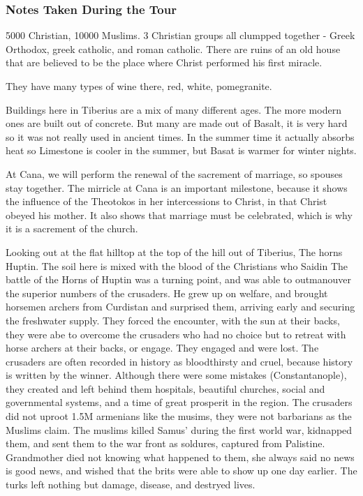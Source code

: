 \documentclass[letterpaper]{report}
\begin{document}
\subsubsection{Notes Taken During the Tour}
5000 Christian, 10000 Muslims.
3 Christian groups all clumpped together - Greek Orthodox, greek catholic, and roman catholic.
There are ruins of an old house that are believed to be the place where Christ performed his first miracle.

They have many types of wine there, red, white, pomegranite.

Buildings here in Tiberius are a mix of many different ages. The more modern ones are built out of concrete.
 But many are made out of Basalt, it is very hard so it was not really used in ancient times. In the summer time it actually absorbs heat so Limestone is cooler in the summer, but Basat is warmer for winter nights.

At Cana, we will perform the renewal of the sacrement of marriage, so spouses stay together.
The mirricle at Cana is an important milestone, because it shows the influence of the Theotokos in her intercessions to Christ, in that Christ obeyed his mother. It also shows that marriage must be celebrated, which is why it is a sacrement of the church.

 Looking out at the flat hilltop at the top of the hill out of Tiberius, The horns Huptin. The soil here is mixed with the blood of the Christians who Saidin 
The battle of the Horns of Huptin was a turning point, and was able to outmanouver the superior numbers of the crusaders.  He grew up on welfare, and brought horsemen archers from Curdistan and surprised them, arriving early and securing the freshwater supply. They forced the encounter, with the sun at their backs, they were abe to overcome the crusaders who had no choice but to retreat with horse archers at their backs, or engage. They engaged and were lost.
The crusaders are often recorded in history as bloodthirsty and cruel, because history is written by the winner. Although there were some mistakes (Constantanople), they created and left behind them hospitals, beautiful churches, social and governmental systems, and a time of great prosperit in the region.
The crusaders did not uproot 1.5M armenians like the musims, they were not barbarians as the Muslims claim. The muslims killed Samus' during the first world war, kidnapped them, and sent them to the war front as soldures, captured from Palistine. Grandmother died not knowing what happened to them, she always said no news is good news, and wished that the brits were able to show up one day earlier. The turks left nothing but damage, disease, and destryed lives. 
\end{document}
